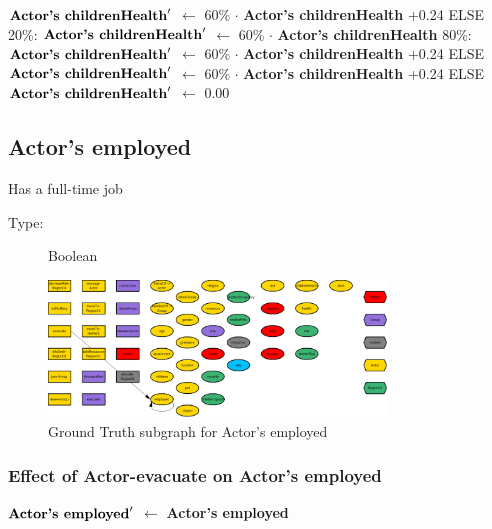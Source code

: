 \documentclass{article}%
\begin{document}
\begin{flushleft}
$\mbox{\textbf{Actor's childrenHealth}} '$%
$\leftarrow$%
60\%%
$\cdot$%
\textbf{Actor's childrenHealth}%
+0.24%
\linebreak%
\hspace*{6em}%
ELSE %
\linebreak%
\hspace*{8em}%
20\%: %
$\mbox{\textbf{Actor's childrenHealth}} '$%
$\leftarrow$%
60\%%
$\cdot$%
\textbf{Actor's childrenHealth}%
\linebreak%
\hspace*{8em}%
80\%: %
$\mbox{\textbf{Actor's childrenHealth}} '$%
$\leftarrow$%
60\%%
$\cdot$%
\textbf{Actor's childrenHealth}%
+0.24%
\linebreak%
\hspace*{4em}%
ELSE %
$\mbox{\textbf{Actor's childrenHealth}} '$%
$\leftarrow$%
60\%%
$\cdot$%
\textbf{Actor's childrenHealth}%
+0.24%
\linebreak%
\hspace*{2em}%
ELSE %
$\mbox{\textbf{Actor's childrenHealth}} '$%
$\leftarrow$%
0.00%
\end{flushleft}

%
\subsection{Actor's employed}%
\label{subsec:Actor's employed}%
Has a full{-}time job%
\begin{description}%
\item[Type:]%
Boolean%
\end{description}%


\begin{figure}[ht]%
\centering%
\includegraphics[width=0.8\textwidth]{images/employedOfActor.png}%
\caption{Ground Truth subgraph for Actor's employed}%
\end{figure}

%
\subsubsection{Effect of Actor{-}evacuate on Actor's employed}%
\label{ssubsec:Effect of Actor{-}evacuate on Actor's employed}%
\begin{flushleft}%
$\mbox{\textbf{Actor's employed}} '$%
$\leftarrow$%
\textbf{Actor's employed}%
\end{flushleft}
\end{document}
